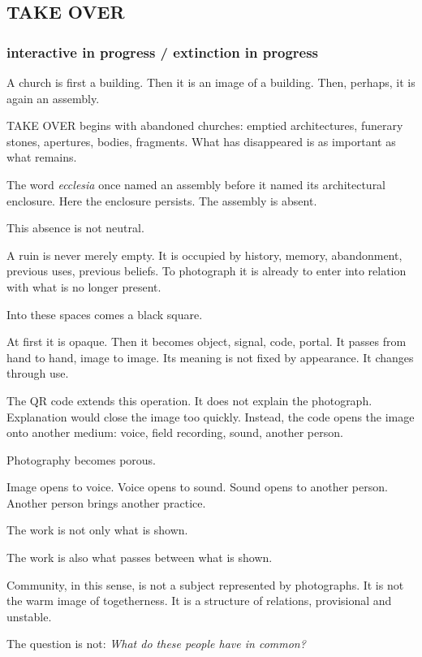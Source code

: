 \subsection{TAKE OVER}\label{take-over}

\subsubsection{interactive in progress / extinction in
progress}\label{interactive-in-progress-extinction-in-progress}

A church is first a building. Then it is an image of a building. Then,
perhaps, it is again an assembly.

TAKE OVER begins with abandoned churches: emptied architectures,
funerary stones, apertures, bodies, fragments. What has disappeared is
as important as what remains.

The word \emph{ecclesia} once named an assembly before it named its
architectural enclosure. Here the enclosure persists. The assembly is
absent.

This absence is not neutral.

A ruin is never merely empty. It is occupied by history, memory,
abandonment, previous uses, previous beliefs. To photograph it is
already to enter into relation with what is no longer present.

Into these spaces comes a black square.

At first it is opaque. Then it becomes object, signal, code, portal. It
passes from hand to hand, image to image. Its meaning is not fixed by
appearance. It changes through use.

The QR code extends this operation. It does not explain the photograph.
Explanation would close the image too quickly. Instead, the code opens
the image onto another medium: voice, field recording, sound, another
person.

Photography becomes porous.

Image opens to voice. Voice opens to sound. Sound opens to another
person. Another person brings another practice.

The work is not only what is shown.

The work is also what passes between what is shown.

Community, in this sense, is not a subject represented by photographs.
It is not the warm image of togetherness. It is a structure of
relations, provisional and unstable.

The question is not: \emph{What do these people have in common?}

